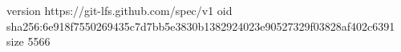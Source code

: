 version https://git-lfs.github.com/spec/v1
oid sha256:6e918f7550269435c7d7bb5e3830b1382924023e90527329f03828af402c6391
size 5566
